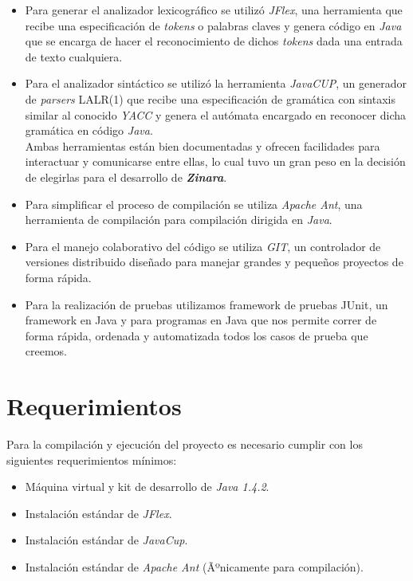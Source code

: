 \documentclass[12pt, spanish]{report}
\begin{document}
\begin{itemize}
\item Para generar el analizador lexicogr\'afico se utiliz\'o
  \emph{JFlex}\cite{jflex}, una herramienta que recibe una
  especificaci\'on de \emph{tokens} o palabras claves y genera c\'odigo en
  \emph{Java} que se encarga de hacer el reconocimiento de dichos
  \emph{tokens} dada una entrada de texto cualquiera.

\item Para el analizador sint\'actico se utiliz\'o la herramienta
  \emph{JavaCUP}\cite{javacup}, un generador de \emph{parsers} LALR(1)
  que recibe una especificaci\'on de gram\'atica con sintaxis similar al
  conocido \emph{YACC} y genera el aut\'omata encargado en reconocer
  dicha gram\'atica en c\'odigo \emph{Java}.\\

  Ambas herramientas est\'an bien documentadas y ofrecen facilidades
  para interactuar y comunicarse entre ellas, lo cual tuvo un gran
  peso en la decisi\'on de elegirlas para el desarrollo de
  \emph{\textbf{Zinara}}.

\item Para simplificar el proceso de compilaci\'on se utiliza
  \emph{Apache Ant}\cite{ant}, una herramienta de compilaci\'on para
  compilaci\'on dirigida en \emph{Java}.

\item Para el manejo colaborativo del c\'odigo se utiliza
  \emph{GIT}\cite{git}, un controlador de versiones distribuido
  dise\~nado para manejar grandes y peque\~nos proyectos de forma r\'apida.

\item Para la realizaci\'on de pruebas utilizamos framework de pruebas
      JUnit, un framework en Java y para programas en Java que nos
      permite correr de forma r\'apida, ordenada y automatizada todos
      los casos de prueba que creemos.
\end{itemize}

\section{Requerimientos}
\label{sec:requ}

Para la compilaci\'on y ejecuci\'on del proyecto es necesario cumplir con
los siguientes requerimientos m\'inimos:

\begin{itemize}
\item M\'aquina virtual y kit de desarrollo de \emph{Java 1.4.2}.
\item Instalaci\'on est\'andar de \emph{JFlex}.
\item Instalaci\'on est\'andar de \emph{JavaCup}.
\item Instalaci\'on est\'andar de \emph{Apache Ant} (Ãºnicamente para
  compilaci\'on).
\end{itemize}
\end{document}
